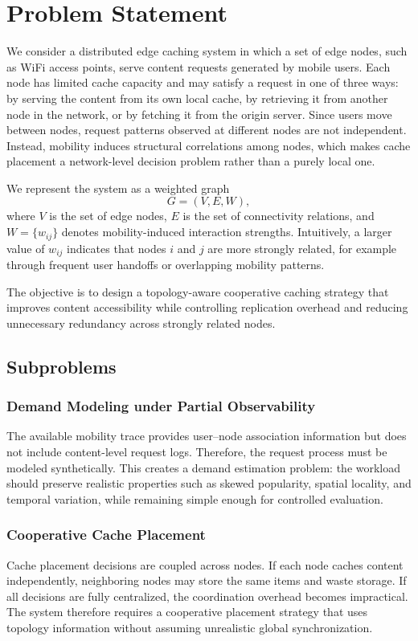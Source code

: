 \section{Problem Statement}

We consider a distributed edge caching system in which a set of edge nodes, such as WiFi access points, serve content requests generated by mobile users. Each node has limited cache capacity and may satisfy a request in one of three ways: by serving the content from its own local cache, by retrieving it from another node in the network, or by fetching it from the origin server. Since users move between nodes, request patterns observed at different nodes are not independent. Instead, mobility induces structural correlations among nodes, which makes cache placement a network-level decision problem rather than a purely local one.

We represent the system as a weighted graph
\[
G = (V, E, W),
\]
where \(V\) is the set of edge nodes, \(E\) is the set of connectivity relations, and \(W = \{w_{ij}\}\) denotes mobility-induced interaction strengths. Intuitively, a larger value of \(w_{ij}\) indicates that nodes \(i\) and \(j\) are more strongly related, for example through frequent user handoffs or overlapping mobility patterns.

The objective is to design a topology-aware cooperative caching strategy that improves content accessibility while controlling replication overhead and reducing unnecessary redundancy across strongly related nodes.

\subsection{Subproblems}

\subsubsection{Demand Modeling under Partial Observability}
The available mobility trace provides user--node association information but does not include content-level request logs. Therefore, the request process must be modeled synthetically. This creates a demand estimation problem: the workload should preserve realistic properties such as skewed popularity, spatial locality, and temporal variation, while remaining simple enough for controlled evaluation.

\subsubsection{Cooperative Cache Placement}
Cache placement decisions are coupled across nodes. If each node caches content independently, neighboring nodes may store the same items and waste storage. If all decisions are fully centralized, the coordination overhead becomes impractical. The system therefore requires a cooperative placement strategy that uses topology information without assuming unrealistic global synchronization.

